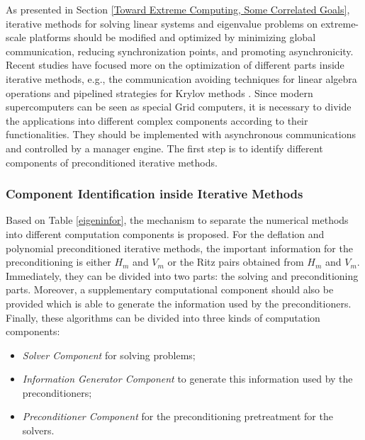 As presented in Section \ref{Toward Extreme Computing, Some Correlated Goals}, iterative methods for solving linear systems and eigenvalue problems on extreme-scale platforms should be modified and optimized by minimizing global communication, reducing synchronization points, and promoting asynchronicity. Recent studies have focused more on the optimization of different parts inside iterative methods, e.g., the communication avoiding techniques for linear algebra operations \cite{hoemmen2010communication, carson2015communication} and pipelined strategies for Krylov methods \cite{morgan2016stochastic, cools2017communication}. Since modern supercomputers can be seen as special Grid computers, it is necessary to divide the applications into different complex components according to their functionalities. They should be implemented with asynchronous communications and controlled by a manager engine. The first step is to identify different components of preconditioned iterative methods.

\subsubsection{Component Identification inside Iterative Methods}

Based on Table \ref{eigeninfor}, the mechanism to separate the numerical methods into different computation components is proposed. For the deflation and polynomial preconditioned iterative methods, the important information for the preconditioning is either $H_m$ and $V_m$ or the Ritz pairs obtained from $H_m$ and $V_m$.  Immediately, they can be divided into two parts: the solving and preconditioning parts. Moreover, a supplementary computational component should also be provided which is able to generate the information used by the preconditioners. Finally, these algorithms can be divided into three kinds of computation components:

\begin{itemize}
	\item \textit{Solver Component} for solving problems;
	\item \textit{Information Generator Component} to generate this information used by the preconditioners;
	\item \textit{Preconditioner Component} for the preconditioning pretreatment for the solvers.
\end{itemize}

